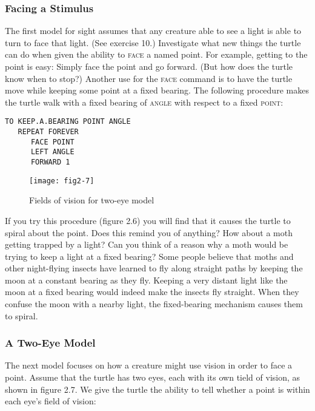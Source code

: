 \documentclass{book}
\begin{document}
\subsubsection{Facing a Stimulus}

The first model for sight assumes that any creature able to see a light is
able to turn to face that light. (See exercise 10.) Investigate what new
things the turtle can do when given the ability to \textsc{face} a named point.
For example, getting to the point is easy: Simply face the point and go
forward. (But how does the turtle know when to stop?) Another use for
the \textsc{face} command is to have the turtle move while keeping some point
at a fixed bearing. The following procedure makes the turtle walk with
a fixed bearing of \textsc{angle} with respect to a fixed \textsc{point}:

\begin{verbatim}
TO KEEP.A.BEARING POINT ANGLE
   REPEAT FOREVER
      FACE POINT
      LEFT ANGLE
      FORWARD 1
\end{verbatim}

\begin{figure}
\begin{center}
\texttt{[image: fig2-7]}
\caption{Fields of vision for two-eye model}
\end{center}
\end{figure}

If you try this procedure (figure 2.6) you will find that it causes the
turtle to spiral about the point. Does this remind you of anything? How
about a moth getting trapped by a light? Can you think of a reason
why a moth would be trying to keep a light at a fixed bearing? Some
people believe that moths and other night-flying insects have learned to
fly along straight paths by keeping the moon at a constant bearing as
they fly. Keeping a very distant light like the moon at a fixed bearing
would indeed make the insects fly straight. When they confuse the moon
with a nearby light, the fixed-bearing mechanism causes them to spiral.

\subsubsection{A Two-Eye Model}

The next model focuses on how a creature might use vision in order to
face a point. Assume that the turtle has two eyes, each with its own
tield of vision, as shown in figure 2.7. We give the turtle the ability to
tell whether a point is within each eye's field of vision:
\end{document}
